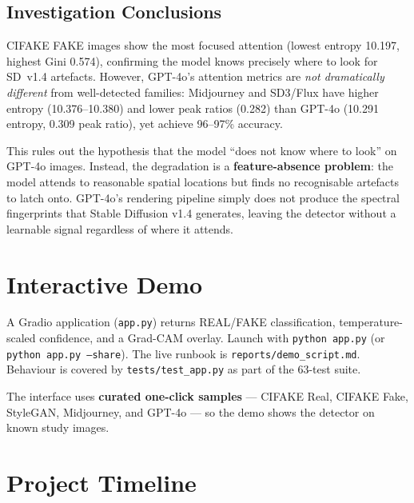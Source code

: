 \documentclass[12pt,a4paper]{article}
\begin{document}
\subsection{Investigation Conclusions}

CIFAKE FAKE images show the most focused attention (lowest entropy 10.197, highest Gini 0.574), confirming the model knows precisely where to look for SD~v1.4 artefacts. However, GPT-4o's attention metrics are \emph{not dramatically different} from well-detected families: Midjourney and SD3/Flux have higher entropy (10.376--10.380) and lower peak ratios (0.282) than GPT-4o (10.291 entropy, 0.309 peak ratio), yet achieve 96--97\% accuracy.

This rules out the hypothesis that the model ``does not know where to look'' on GPT-4o images. Instead, the degradation is a \textbf{feature-absence problem}: the model attends to reasonable spatial locations but finds no recognisable artefacts to latch onto. GPT-4o's rendering pipeline simply does not produce the spectral fingerprints that Stable Diffusion v1.4 generates, leaving the detector without a learnable signal regardless of where it attends.

\section{Interactive Demo}
\label{sec:demo}

A Gradio application (\texttt{app.py}) returns REAL/FAKE classification, temperature-scaled confidence, and a Grad-CAM overlay. Launch with \texttt{python app.py} (or \texttt{python app.py --share}). The live runbook is \texttt{reports/demo\_script.md}. Behaviour is covered by \texttt{tests/test\_app.py} as part of the 63-test suite.

The interface uses \textbf{curated one-click samples} --- CIFAKE Real, CIFAKE Fake, StyleGAN, Midjourney, and GPT-4o --- so the demo shows the detector on known study images.

\section{Project Timeline}
\end{document}
